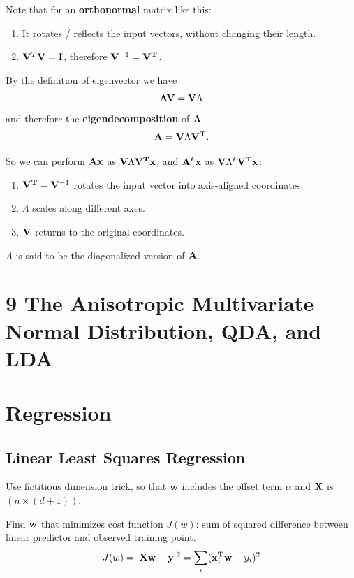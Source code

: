 \documentclass[12pt]{article}
\begin{document}
Note that for an \textbf{orthonormal} matrix like this:
\begin{enumerate}
\item It rotates / reflects the input vectors, without changing their length.
\item  $\mathbf V^T\mathbf V = \mathbf I$, therefore $\mathbf V^{-1} = \mathbf V^{\mathbf{T}}$.
\end{enumerate}


By the definition of eigenvector we have
\begin{align*}
  \mathbf A\mathbf V = \mathbf V\Lambda
\end{align*}
and therefore the \textbf{eigendecomposition} of $\mathbf A$
\begin{align*}
  \mathbf A = \mathbf V\Lambda\mathbf V^{\mathbf{T}}.
\end{align*}

So we can perform $\mathbf A\mathbf x$ as $\mathbf V\Lambda\mathbf V^{\mathbf{T}}\mathbf x$, and $\mathbf A^k\mathbf x$ as
$\mathbf V\Lambda^k\mathbf V^{\mathbf{T}}\mathbf x$:

\begin{enumerate}
\item $\mathbf V^{\mathbf{T}} = \mathbf V^{-1}$ rotates the input vector into axis-aligned coordinates.
\item $\Lambda$ scales along different axes.
\item $\mathbf V$ returns to the original coordinates.
\end{enumerate}

$\Lambda$ is said to be the diagonalized version of $\mathbf A$.
\section*{9 The Anisotropic Multivariate Normal Distribution, QDA, and LDA}

\newpage
\section*{Regression}
\subsection*{Linear Least Squares Regression}
Use fictitious dimension trick, so that $\mathbf w$ includes the offset term $\alpha$
and $\mathbf X$ is $(n \times (d + 1))$.
\\
\begin{mdframed}
Find $\mathbf w$ that minimizes cost function $J(w)$: sum of squared difference between
linear predictor and observed training point.
\begin{align*}
  J(w) = |\mathbf X \mathbf w - \mathbf y|^2 = \sum_i (\mathbf x_i^{\mathbf{T}}\mathbf w - y_i)^2
\end{align*}
\end{mdframed}
\end{document}
